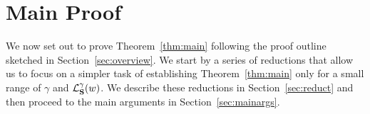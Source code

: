 \section{Main Proof}
\label{sec:mainproof}
We now set out to prove Theorem~\ref{thm:main} following the proof outline sketched in Section~\ref{sec:overview}. We start by a series of reductions that allow us to focus on a simpler task of establishing Theorem~\ref{thm:main} only for a small range of $\gamma$ and $\mathcal{L}_{\mathbf{S}}^\gamma(w)$. We describe these reductions in Section~\ref{sec:reduct} and then proceed to the main arguments in Section~\ref{sec:mainargs}.





